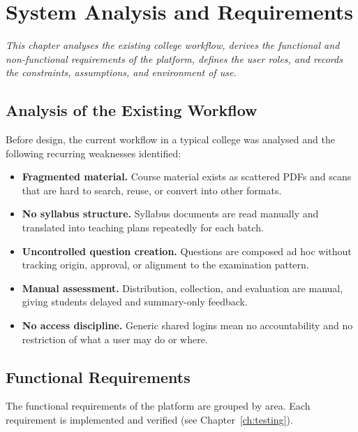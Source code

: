 \chapter{System Analysis and Requirements}
\label{ch:requirements}

\begin{center}
\textit{This chapter analyses the existing college workflow, derives the
functional and non-functional requirements of the platform, defines the user
roles, and records the constraints, assumptions, and environment of use.}
\end{center}

\vspace*{\fill}
\clearpage
\section{Analysis of the Existing Workflow}

\noindent Before design, the current workflow in a typical college was
analysed and the following recurring weaknesses identified:

\begin{itemize}
  \item \textbf{Fragmented material.} Course material exists as scattered
  PDFs and scans that are hard to search, reuse, or convert into other
  formats.
  \item \textbf{No syllabus structure.} Syllabus documents are read manually
  and translated into teaching plans repeatedly for each batch.
  \item \textbf{Uncontrolled question creation.} Questions are composed ad hoc
  without tracking origin, approval, or alignment to the examination pattern.
  \item \textbf{Manual assessment.} Distribution, collection, and evaluation
  are manual, giving students delayed and summary-only feedback.
  \item \textbf{No access discipline.} Generic shared logins mean no
  accountability and no restriction of what a user may do or where.
\end{itemize}

\section{Functional Requirements}

\noindent The functional requirements of the platform are grouped by area. Each
requirement is implemented and verified (see Chapter~\ref{ch:testing}).

